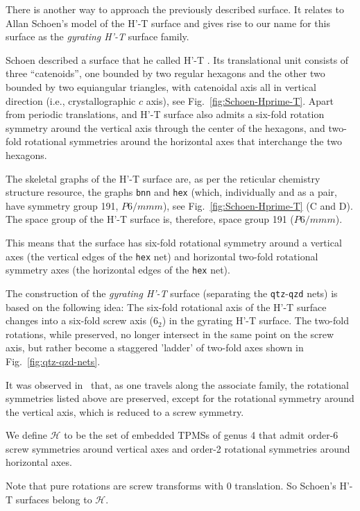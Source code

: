 \documentclass[a4paper]{amsart}
\theoremstyle{plain}
\theoremstyle{definition}
\def \cH {\mathcal{H}}
\begin{document}
There is another way to approach the previously described surface. It relates
to Allan Schoen's model of the H'-T surface \cite{Schoen_1970} and gives rise
to our name for this surface as the \textit{gyrating H'-T} surface family.  

Schoen described a surface that he called H'-T \cite{Schoen_1970}. Its
translational unit consists of three ``catenoids'', one bounded by two regular
hexagons and the other two bounded by two equiangular triangles, with
catenoidal axis all in vertical direction (i.e., crystallographic $c$ axis),
see Fig.\ \ref{fig:Schoen-Hprime-T}.   Apart from periodic translations, and
H'-T surface also admits a six-fold rotation symmetry around the vertical axis
through the center of the hexagons, and two-fold rotational symmetries around
the horizontal axes that interchange the two hexagons.  

The skeletal graphs of the H'-T surface are, as per the reticular chemistry
structure resource, the graphs \texttt{bnn} and \texttt{hex} (which,
individually and as a pair, have symmetry group 191, $P6/mmm$), see Fig.\
\ref{fig:Schoen-Hprime-T} (C and D). The space group of the H'-T surface is,
therefore, space group 191 ($P6/mmm$). 

This means that the surface has six-fold rotational symmetry around a vertical
axes (the vertical edges of the \texttt{hex} net) and horizontal two-fold
rotational symmetry axes (the horizontal edges of the \texttt{hex} net). 

The construction of the \textit{gyrating H'-T} surface (separating the
\texttt{qtz}-\texttt{qzd} nets) is based on the following idea: The six-fold
rotational axis of the H'-T surface changes into a six-fold screw axis ($6_2$)
in the gyrating H'-T surface. The two-fold rotations, while preserved, no
longer intersect in the same point on the screw axis, but rather become a
staggered 'ladder' of two-fold axes shown in Fig.\ \ref{fig:qtz-qzd-nets}.

It was observed in~\cite[Lemma~4]{kgb1996} that, as one travels along the
associate family, the rotational symmetries listed above are preserved, except
for the rotational symmetry around the vertical axis, which is reduced to a
screw symmetry.

We define $\cH$ to be the set of embedded TPMSs of genus 4 that admit order-6
screw symmetries around vertical axes and order-2 rotational symmetries around
horizontal axes.  

Note that pure rotations are screw transforms with 0 translation.  So Schoen's
H'-T surfaces belong to $\cH$.  
\end{document}
